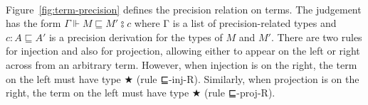 \begin{code}[hide]
\AgdaSymbol{)}\<%
\\
%
\>[3]\AgdaSpace{}%
\AgdaSymbol{(}\AgdaSpace{}%
\AgdaSymbol{:}\AgdaSpace{}%
\AgdaSpace{}%
\AgdaSpace{}%
\AgdaSpace{}%
\AgdaSpace{}%
\AgdaSymbol{)}\<%
\\
%
\>[3]\AgdaSpace{}%
\AgdaSpace{}%
\AgdaSpace{}%
\<%
\\
\>[0]\AgdaSpace{}%
\AgdaSymbol{\{}\AgdaSpace{}%
\AgdaSymbol{\}}\AgdaSpace{}%
\AgdaSymbol{\{}\AgdaSpace{}%
\AgdaDottedPattern{\AgdaSymbol{)}}\AgdaSymbol{\}}\AgdaSpace{}%
\AgdaSpace{}%
\AgdaSpace{}%
\AgdaSymbol{=}\AgdaSpace{}%
\<%
\\
\>[0]\AgdaSpace{}%
\AgdaSymbol{\{}\AgdaSymbol{\}}\AgdaSpace{}%
\AgdaSymbol{\{}\AgdaSpace{}%
\AgdaSpace{}%
\AgdaDottedPattern{\AgdaSymbol{\AgdaUnderscore{})}}\AgdaSymbol{\}}\AgdaSpace{}%
\AgdaSymbol{(}\AgdaSpace{}%
\AgdaSpace{}%
\AgdaSymbol{)}\AgdaSpace{}%
\AgdaSymbol{(}\AgdaSpace{}%
\AgdaSpace{}%
\AgdaSymbol{)}\<%
\\
\>[0][@{}l@{\AgdaIndent{0}}]%
\>[4]\AgdaSpace{}%
\AgdaSpace{}%
\AgdaSpace{}%
\AgdaSpace{}%
\AgdaSymbol{|}\AgdaSpace{}%
\AgdaSpace{}%
\AgdaSpace{}%
\<%
\\
\>[0]\AgdaSpace{}%
\AgdaSymbol{|}\AgdaSpace{}%
\AgdaSpace{}%
\AgdaSymbol{|}\AgdaSpace{}%
\AgdaSpace{}%
\AgdaSymbol{=}\AgdaSpace{}%
\<%
\end{code}

Figure~\ref{fig:term-precision} defines the precision relation on
terms.  The judgement has the form $Γ ⊩ M ⊑ M′ ⦂ c$ where Γ is a list
of precision-related types and $c : A ⊑ A′$ is a precision derivation
for the types of $M$ and $M′$. There are two rules for injection and
also for projection, allowing either to appear on the left or right
across from an arbitrary term. However, when injection is on the
right, the term on the left must have type ★ (rule
\textsf{⊑-inj-R}).  Similarly, when projection is on the right, the
term on the left must have type ★ (rule \textsf{⊑-proj-R}).


